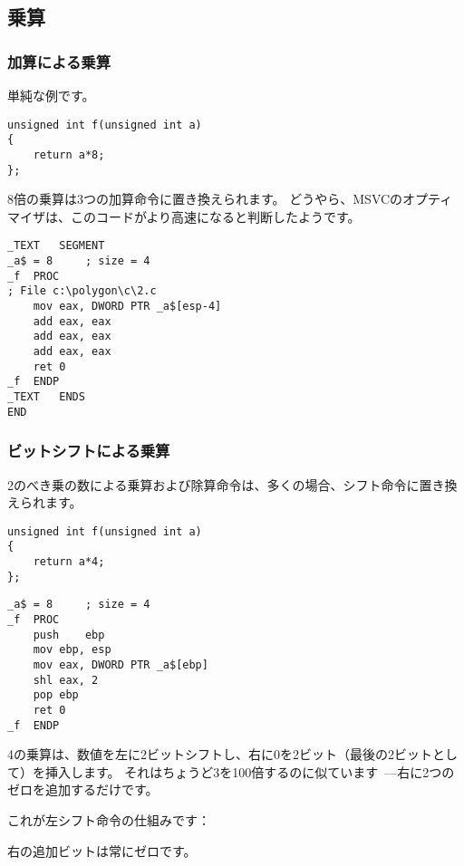 ﻿\subsection{乗算}

\subsubsection{加算による乗算}

単純な例です。

\begin{lstlisting}[style=customc]
unsigned int f(unsigned int a)
{
	return a*8;
};
\end{lstlisting}

8倍の乗算は3つの加算命令に置き換えられます。
どうやら、MSVCのオプティマイザは、このコードがより高速になると判断したようです。

\begin{lstlisting}[caption=\Optimizing MSVC 2010,style=customasmx86]
_TEXT	SEGMENT
_a$ = 8		; size = 4
_f	PROC
; File c:\polygon\c\2.c
	mov	eax, DWORD PTR _a$[esp-4]
	add	eax, eax
	add	eax, eax
	add	eax, eax
	ret	0
_f	ENDP
_TEXT	ENDS
END
\end{lstlisting}

\subsubsection{ビットシフトによる乗算}
\label{subsec:mult_using_shifts}

2のべき乗の数による乗算および除算命令は、多くの場合、シフト命令に置き換えられます。

\begin{lstlisting}[style=customc]
unsigned int f(unsigned int a)
{
	return a*4;
};
\end{lstlisting}

\begin{lstlisting}[caption=\NonOptimizing MSVC 2010,style=customasmx86]
_a$ = 8		; size = 4
_f	PROC
	push	ebp
	mov	ebp, esp
	mov	eax, DWORD PTR _a$[ebp]
	shl	eax, 2
	pop	ebp
	ret	0
_f	ENDP
\end{lstlisting}


4の乗算は、数値を左に2ビットシフトし、右に0を2ビット（最後の2ビットとして）を挿入します。
それはちょうど3を100倍するのに似ています~---右に2つのゼロを追加するだけです。

これが左シフト命令の仕組みです：



右の追加ビットは常にゼロです。

